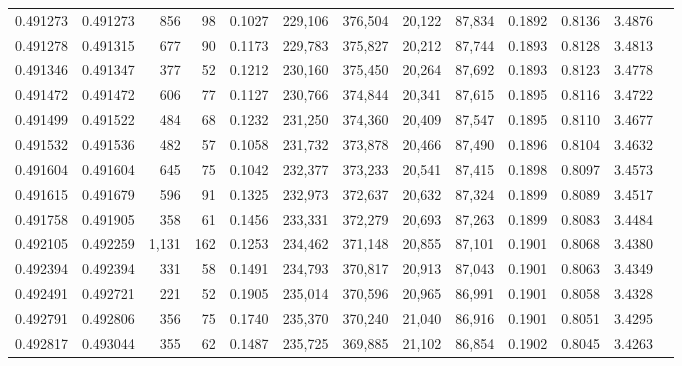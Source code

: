 \begin{tabular}{rrrrrrrrrrrrr}
0.491273 & 0.491273 &   856 &    98 &                                     0.1027 & 229,106 & 376,504 &  20,122 &  87,834 & 0.1892 & 0.8136 & 3.4876 \\
0.491278 & 0.491315 &   677 &    90 &                                     0.1173 & 229,783 & 375,827 &  20,212 &  87,744 & 0.1893 & 0.8128 & 3.4813 \\
0.491346 & 0.491347 &   377 &    52 &                                     0.1212 & 230,160 & 375,450 &  20,264 &  87,692 & 0.1893 & 0.8123 & 3.4778 \\
0.491472 & 0.491472 &   606 &    77 &                                     0.1127 & 230,766 & 374,844 &  20,341 &  87,615 & 0.1895 & 0.8116 & 3.4722 \\
0.491499 & 0.491522 &   484 &    68 &                                     0.1232 & 231,250 & 374,360 &  20,409 &  87,547 & 0.1895 & 0.8110 & 3.4677 \\
0.491532 & 0.491536 &   482 &    57 &                                     0.1058 & 231,732 & 373,878 &  20,466 &  87,490 & 0.1896 & 0.8104 & 3.4632 \\
0.491604 & 0.491604 &   645 &    75 &                                     0.1042 & 232,377 & 373,233 &  20,541 &  87,415 & 0.1898 & 0.8097 & 3.4573 \\
0.491615 & 0.491679 &   596 &    91 &                                     0.1325 & 232,973 & 372,637 &  20,632 &  87,324 & 0.1899 & 0.8089 & 3.4517 \\
0.491758 & 0.491905 &   358 &    61 &                                     0.1456 & 233,331 & 372,279 &  20,693 &  87,263 & 0.1899 & 0.8083 & 3.4484 \\
0.492105 & 0.492259 & 1,131 &   162 &                                     0.1253 & 234,462 & 371,148 &  20,855 &  87,101 & 0.1901 & 0.8068 & 3.4380 \\
0.492394 & 0.492394 &   331 &    58 &                                     0.1491 & 234,793 & 370,817 &  20,913 &  87,043 & 0.1901 & 0.8063 & 3.4349 \\
0.492491 & 0.492721 &   221 &    52 &                                     0.1905 & 235,014 & 370,596 &  20,965 &  86,991 & 0.1901 & 0.8058 & 3.4328 \\
0.492791 & 0.492806 &   356 &    75 &                                     0.1740 & 235,370 & 370,240 &  21,040 &  86,916 & 0.1901 & 0.8051 & 3.4295 \\
0.492817 & 0.493044 &   355 &    62 &                                     0.1487 & 235,725 & 369,885 &  21,102 &  86,854 & 0.1902 & 0.8045 & 3.4263 \\

\end{tabular}
